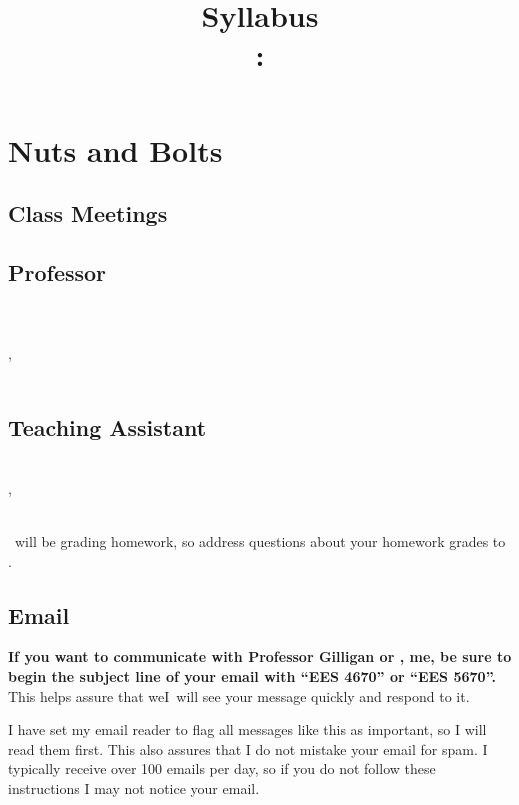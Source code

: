 \documentclass[11pt,twoside]{jgsyllabus}\usepackage[]{graphicx}\usepackage[]{color}
\title{Syllabus\\
\ShortCourseNumber: \LongCourseName}
\begin{document}
\maketitle

\iffalse
\noindent
\textbf{\large \textsc{Note:} This is a draft syllabus, subject to change.}

\fi
\section[Nuts \& Bolts]{Nuts and Bolts}
\label{sec:NutsAndBolts}
\subsection{Class Meetings}
\ClassMeetings
\subsection{Professor}
\label{sec:Professor}
\ProfName\\
\ProfDescr\\
\ProfOffice, \ProfPhone\\
\ProfEmail\\
\ProfOfficeHours
%
\ifTA
\subsection{Teaching Assistant}
\label{sec:TA}
\TaName\\
\TaOfficeLoc\ifTaPhone , \TaPhone\fi\\
\TaEmail\\
\TaOfficeHours
\medskip

\noindent
\TaTitle\ will be grading homework, so address questions about your homework grades
to \TaAccusative.
\fi

\subsection{Email}
\textbf{%
If you want to communicate with
\ifTA
Professor Gilligan or \TaTitle,
\else
me,
\fi
be sure to begin the
subject line of your email with ``{\scshape EES 4670}'' or ``{\scshape EES 5670}''.
}%
This helps assure
that \ifTA we\else I\fi\ will see your message quickly and respond to it.

I have set my email reader to flag all messages like this as important, so I
will read them first. This also assures that I do not mistake your email for
spam. I typically receive over 100 emails per day, so if you do not follow these
instructions I may not notice your email.
\end{document}
